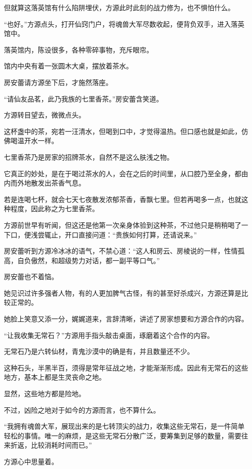 \begin{this_body}
但就算这落英馆有什么陷阱埋伏，方源此时此刻的战力修为，也不惧怕什么。

“也好。”方源点头，打开仙窍门户，将魂兽大军尽数收起，便背负双手，进入落英馆中。

落英馆内，陈设很多，各种零碎事物，充斥眼帘。

馆内中央有着一张圆木大桌，摆放着茶水。

房安蕾请方源坐下后，才施然落座。

“请仙友品茗，此乃我族的七里香茶。”房安蕾含笑道。

方源转目望去，微微点头。

这杯盏中的茶，宛若一汪清水，但喝到口中，才觉得温热。但口感也就是如此，仿佛喝温开水一样。

七里香茶乃是房家的招牌茶水，自然不是这么肤浅之物。

它真正的妙处，是在于喝过茶水的人，会在之后的时间里，从口腔乃至全身，都由内而外地散发出茶香气息。

若是连喝七杯，就会七天七夜散发浓郁茶香，香飘七里。但若再喝多一点，也就这种程度，因此称之为七里香茶。

方源前世早有听闻，但这还是他第一次亲身体验到这种茶，不过他只是稍稍喝了一下口，便浅尝辄止，开口直接问道：“贵族如何打算，还请说来。”

房安蕾听到方源冷冰冰的语气，不禁心道：“这人和房云、房棱说的一样，性情孤高，自负傲然，和超级势力对话，都一副平等口气。”

房安蕾也不着恼。

她见识过许多强者人物，有的人更加脾气古怪，有的甚至好杀成兴，方源还算是比较正常的。

她脸上笑意又添一分，娓娓道来，言辞清晰，讲述了房家想要和方源合作的内容。

“让我收集无常石？”方源用手指头敲击桌面，琢磨着这个合作的内容。

无常石乃是六转仙材，青鬼沙漠中的确是有，并且数量还不少。

这种石头，半黑半百，须得是常年征战之地，才能渐渐形成。因此有无常石的这些地方，基本上都是生灵丧命之地。

显然，这些地方都是险地。

不过，凶险之地对于如今的方源而言，也不算什么。

“我拥有魂兽大军，展现出来的是七转顶尖的战力，收集这些无常石，是一件简单轻松的事情。唯一的麻烦，是这些无常石分散广泛，要筹集到足够的数量，需要往来折返，比较消耗时间而已。”

方源心中思量着。


\end{this_body}
